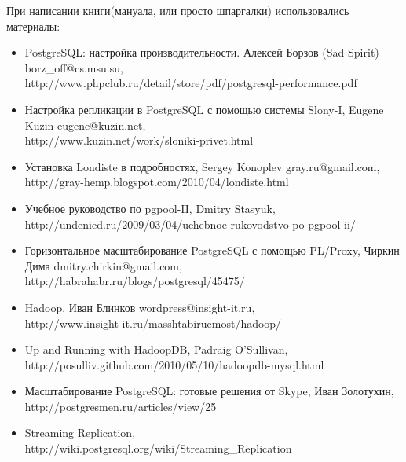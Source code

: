 \thispagestyle{empty}
При написании книги(мануала, или просто шпаргалки) использовались материалы:
\begin{itemize}
\item PostgreSQL: настройка производительности. Алексей Борзов (Sad Spirit) borz\_off@cs.msu.su, \\
http://www.phpclub.ru/detail/store/pdf/postgresql-performance.pdf
\item Настройка репликации в PostgreSQL с помощью системы Slony-I, Eugene Kuzin eugene@kuzin.net, \\
http://www.kuzin.net/work/sloniki-privet.html
\item Установка Londiste в подробностях, Sergey Konoplev gray.ru@gmail.com, \\
http://gray-hemp.blogspot.com/2010/04/londiste.html
\item Учебное руководство по pgpool-II, Dmitry Stasyuk, \\
http://undenied.ru/2009/03/04/uchebnoe-rukovodstvo-po-pgpool-ii/
\item Горизонтальное масштабирование PostgreSQL с помощью PL/Proxy, Чиркин Дима dmitry.chirkin@gmail.com, \\
http://habrahabr.ru/blogs/postgresql/45475/
\item Hadoop, Иван Блинков wordpress@insight-it.ru, \\
http://www.insight-it.ru/masshtabiruemost/hadoop/
\item Up and Running with HadoopDB, Padraig O'Sullivan, \\
http://posulliv.github.com/2010/05/10/hadoopdb-mysql.html
\item Масштабирование PostgreSQL: готовые решения от Skype, Иван Золотухин, \\
http://postgresmen.ru/articles/view/25
\item Streaming Replication, \\
http://wiki.postgresql.org/wiki/Streaming\_Replication
\end{itemize}


\clearpage